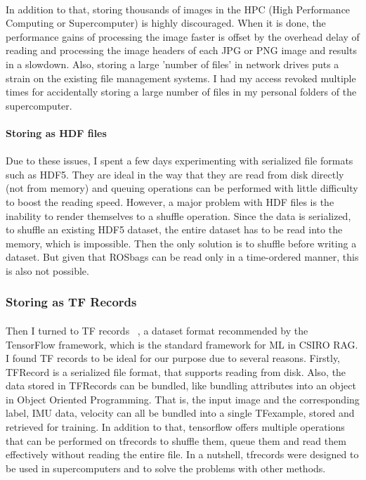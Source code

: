 \paragraph{}
In addition to that, storing thousands of images in the HPC (High Performance Computing or Supercomputer) is highly discouraged. When it is done, the performance gains of processing the image faster is offset by the overhead delay of reading and processing the image headers of each JPG or PNG image and results in a slowdown. Also, storing a large 'number of files' in network drives puts a strain on the existing file management systems. I had my access revoked multiple times for accidentally storing a large number of files in my personal folders of the supercomputer.

\paragraph{}
\textbf{Storing as HDF files}

\paragraph{}
Due to these issues, I spent a few days experimenting with serialized file formats such as HDF5. They are ideal in the way that they are read from disk directly (not from memory) and queuing operations can be performed with little difficulty to boost the reading speed. However, a major problem with HDF files is the inability to render themselves to a shuffle operation. Since the data is serialized, to shuffle an existing HDF5 dataset, the entire dataset has to be read into the memory, which is impossible. Then the only solution is to shuffle before writing a dataset. But given that ROSbags can be read only in a time-ordered manner, this is also not possible.

\subsubsection{Storing as TF Records}

\paragraph{}
Then I turned to TF records ~\cite{tfrecords}, a dataset format recommended by the TensorFlow framework, which is the standard framework for ML in CSIRO RAG. I found TF records to be ideal for our purpose due to several reasons. Firstly, TFRecord is a serialized file format, that supports reading from disk. Also, the data stored in TFRecords can be bundled, like bundling attributes into an object in Object Oriented Programming. That is, the input image and the corresponding label, IMU data, velocity can all be bundled into a single TFexample, stored and retrieved for training. In addition to that, tensorflow offers multiple operations that can be performed on tfrecords to shuffle them, queue them and read them effectively without reading the entire file. In a nutshell, tfrecords were designed to be used in supercomputers and to solve the problems with other methods.


